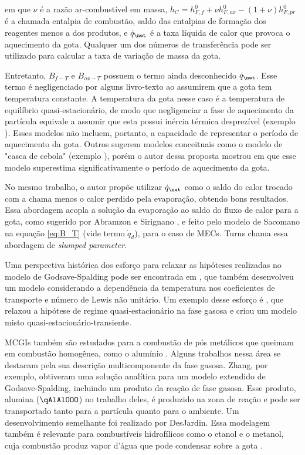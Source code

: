 em que $\nu$ é a razão ar-combustível em massa, $h_C=h^0_{F,f} + \nu h^0_{F,ox} - (1+\nu)h^0_{F,pr}$ é a chamada entalpia de combustão, saldo das entalpias de formação dos reagentes menos a dos produtos, e $\dot q_\net$ é a taxa líquida de calor que provoca o aquecimento da gota.
Qualquer um dos números de transferência pode ser utilizado para calcular a taxa de variação de massa da gota.

Entretanto, $B_{f-T}$ e $B_{ox-T}$ possuem o termo ainda desconhecido $\dot q_\net$.
Esse termo é negligenciado por alguns livro-texto \cite{Glassman2008,Williams1985} ao assumirem que a gota tem temperatura constante. 
A temperatura da gota nesse caso é a temperatura de equilíbrio quasi-estacionário, de modo que negligenciar a fase de aquecimento da partícula equivale a assumir que esta possui inércia térmica desprezível (exemplo \cite{Turns2000,Glassman2008}). 
Esses modelos não incluem, portanto, a capacidade de representar o  período de aquecimento da gota.
Outros sugerem modelos conceituais como o modelo de "casca de cebola" (exemplo \cite[p. 385]{Turns2000}), porém o autor dessa proposta mostrou em \cite{HenningsJ2024MT} que esse modelo superestima significativamente o período de aquecimento da gota.

No mesmo trabalho, o autor propõe utilizar $\dot q_\net$ como o saldo do calor trocado com a chama menos o calor perdido pela evaporação, obtendo bons resultados.
Essa abordagem acopla a solução da evaporação ao saldo do fluxo de calor para a gota, como sugerido por Abramzon e Sirignano \cite{Sirignano1989}, e feito pelo modelo de Sacomano\etal \cite{SacomanoF2022IJHMT} na equação \eqref{eq:B_T} (vide termo $\dot q_d$), para o caso de MECs.
Turns \cite{Turns2000} chama essa abordagem de \emph{slumped parameter.}

Uma perspectiva histórica dos esforço para relaxar as hipóteses realizadas no modelo de Godsave-Spalding pode ser encontrada em \cite{FachiniF1999}, que também desenvolveu um modelo considerando a dependência da temperatura nos coeficientes de transporte e número de Lewis não unitário.
Um exemplo desse esforço é \cite{UlzamaS2007}, que relaxou a hipótese de regime quasi-estacionário na fase gasosa e criou um modelo misto quasi-estacionário-transiente.%

MCGIs também são estudados para a combustão de pós metálicos que queimam em combustão homogênea, como o alumínio \cite[p. 7]{Bergthorson2015}.
Alguns trabalhos nessa área se destacam pela sua descrição multicomponente da fase gasosa. 
Zhang\etal \cite{Zhang2022_Coflow,Zhang2022_Counterflow}, por exemplo, obtiveram uma solução analítica para um modelo extendido de Godsave-Spalding, incluindo um produto da reação de fase gasosa.
Esse produto, alumina ($\qAlAlOOO$) no trabalho deles, é produzido na zona de reação e pode ser transportado tanto para a partícula quanto para o ambiente.
Um desenvolvimento semelhante foi realizado por DesJardin\etal \cite{DesJardin2005}.
Essa modelagem também é relevante para combustíveis hidrofílicos como o etanol e o metanol, cuja combustão produz vapor d'água que pode condensar sobre a  gota \cite{SacomanoF2024CF,SacomanoF2025CF}.



